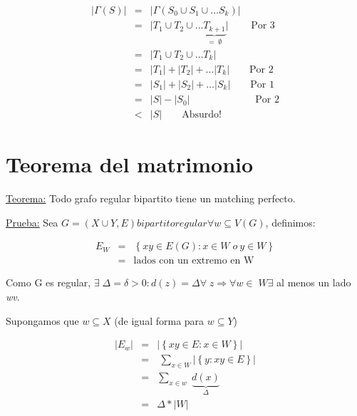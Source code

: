 \documentclass[12pt,a4paper]{report}
\begin{document}
\begin{enumerate}
					\begin{eqnarray}
						\nonumber \lvert \Gamma(S) \rvert &=& \lvert \Gamma(S_{0} \cup S_{1} \cup \dotsc S_{k}) \rvert \\
						\nonumber &=& \lvert T_{1} \cup T_{2} \cup \dotsc \underbrace{T_{k+1}}_{= \; \emptyset} \rvert \qquad \; \text{Por 3} \\
						\nonumber &=& \lvert T_{1} \cup T_{2} \cup \dotsc T_{k} \rvert \\
						\nonumber &=& \lvert T_{1} \rvert + \lvert T_{2} \rvert + \dotsc \lvert T_{k} \rvert \qquad \text{Por 2} \\
						\nonumber &=& \lvert S_{1} \rvert + \lvert S_{2} \rvert + \dotsc \lvert S_{k} \rvert \qquad \text{Por 1} \\
						\nonumber &=& \lvert S \rvert - \lvert S_{0} \rvert \qquad \qquad \qquad \; \; \text{Por 2} \\
						\nonumber &<& \lvert S \rvert \qquad \text{Absurdo!}
					\end{eqnarray}
			\end{enumerate}
			
	\section{Teorema del matrimonio}
	
		\underline{Teorema:} Todo grafo regular bipartito tiene un matching perfecto.
		
		\underline{Prueba:} Sea $G = (X \cup Y, E) bipartito regular \forall w \subseteq V(G)$, definimos:
		
		\begin{eqnarray}
			\nonumber E_{W} &=& \left\lbrace xy \in E(G): x \in W \; o \ y \in W \right\rbrace \\
			\nonumber &=& \text{lados con un extremo en W}
		\end{eqnarray}
		
		Como G es regular, $\exists \; \Delta = \delta > 0 : d(z) = \Delta \forall \; z \Rightarrow \forall w \in \; W \exists$ al menos un lado \textit{wv}.
		
		\vspace{5mm}
		Supongamos que $w \subseteq X$ (de igual forma para $w \subseteq Y$)
		
		\begin{eqnarray}
			\nonumber \lvert E_{w} \rvert &=& \lvert \left\lbrace xy \in E: x \in W \right\rbrace \rvert \\
			\nonumber &=&\ \sum_{x \in W} \lvert \left\lbrace y : xy \in E \right\rbrace \rvert \\
			\nonumber &=& \sum_{x \in w} \; \underbrace{d(x)}_{\Delta} \\
			\nonumber &=& \Delta * \lvert W \rvert
		\end{eqnarray}
		
\end{document}
